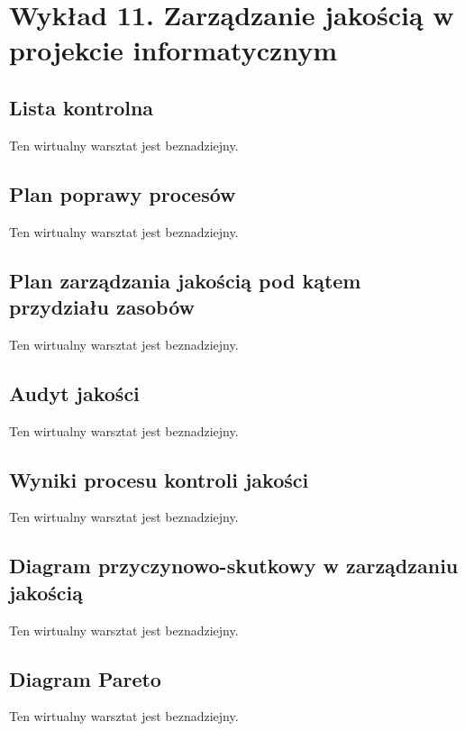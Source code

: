 \chapter{Wykład 11. Zarządzanie jakością w projekcie informatycznym}

\section{Lista kontrolna}

Ten wirtualny warsztat jest beznadziejny.


\section{Plan poprawy procesów}

Ten wirtualny warsztat jest beznadziejny.


\section{Plan zarządzania jakością pod kątem przydziału zasobów}

Ten wirtualny warsztat jest beznadziejny.


\section{Audyt jakości}

Ten wirtualny warsztat jest beznadziejny.


\section{Wyniki procesu kontroli jakości}

Ten wirtualny warsztat jest beznadziejny.


\section{Diagram przyczynowo-skutkowy w zarządzaniu jakością}

Ten wirtualny warsztat jest beznadziejny.


\section{Diagram Pareto}

Ten wirtualny warsztat jest beznadziejny.


